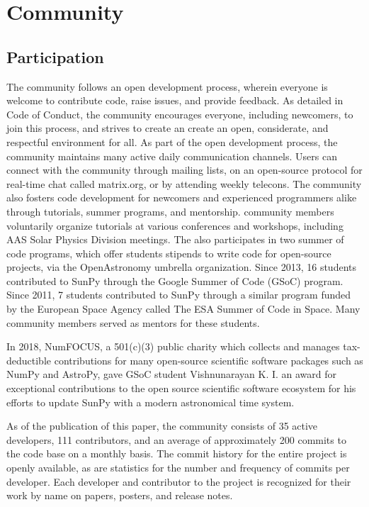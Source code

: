 \section{Community}
\label{sec:community}

\subsection{Participation}

The \sunpy community follows an open development process, wherein everyone is welcome to contribute code, raise issues, and provide feedback.
As detailed in \sunpy Code of Conduct, the community encourages everyone, including newcomers, to join this process, and strives to create an create an open, considerate, and respectful environment for all.
As part of the open development process, the \sunpy community maintains many active daily communication channels.
Users can connect with the community through mailing lists, on an open-source protocol for real-time chat called matrix.org, or by attending weekly telecons.
The \sunpy community also fosters code development for newcomers and experienced programmers alike through tutorials, summer programs, and mentorship.
\sunpy community members voluntarily organize tutorials at various conferences and workshops, including AAS Solar Physics Division meetings.
The \sunpyproj also participates in two summer of code programs, which offer students stipends to write code for open-source projects, via the OpenAstronomy umbrella organization.
Since 2013, 16 students contributed to SunPy through the Google Summer of Code (GSoC) program.
Since 2011, 7 students contributed to SunPy through a similar program funded by the European Space Agency called The ESA Summer of Code in Space.
Many \sunpy community members served as mentors for these students.

In 2018, NumFOCUS, a 501(c)(3) public charity which collects and manages tax-deductible contributions for many open-source scientific software packages such as NumPy and AstroPy, gave GSoC student Vishnunarayan K. I. an award for exceptional contributions to the open source scientific software ecosystem for his efforts to update SunPy with a modern astronomical time system.

As of the publication of this paper, the \sunpy community consists of 35 active developers, 111 contributors, and an average of approximately 200 commits to the code base on a monthly basis.
The commit history for the entire project is openly available, as are statistics for the number and frequency of commits per developer.
Each developer and contributor to the \sunpy project is recognized for their work by name on papers, posters, and release notes.
